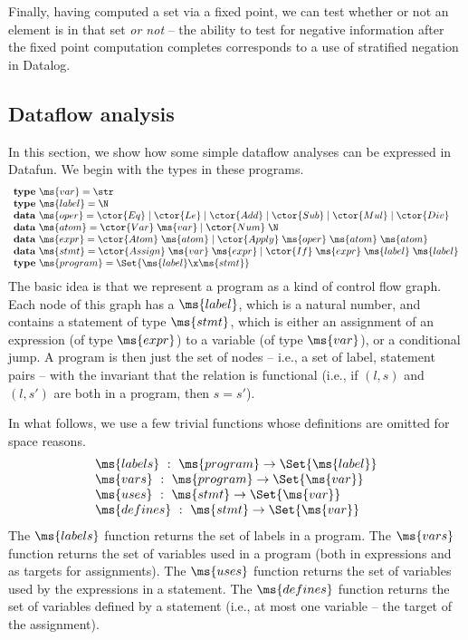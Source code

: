 Finally, having computed a set via a fixed point, we can test whether
or not an element is in that set \emph{or not} -- the ability to test
for negative information after the fixed point computation completes
corresponds to a use of stratified negation in Datalog.


\subsection{Dataflow analysis}
In this section, we show how some simple dataflow analyses can be expressed in
Datafun. We begin with the types in these programs.
\[\begin{array}{l}
\textbf{type}~\ms{var} = \str\\
\textbf{type}~\ms{label} = \N\\
\textbf{data}~\ms{oper} = \ctor{Eq} \pipe \ctor{Le}
\pipe \ctor{Add} \pipe \ctor{Sub} \pipe\ctor{Mul}\pipe\ctor{Div}\\
\textbf{data}~\ms{atom} = \ctor{Var}\;\ms{var} \pipe \ctor{Num}\;\N\\
\textbf{data}~\ms{expr} = \ctor{Atom}\;\ms{atom}
\pipe \ctor{Apply}\;\ms{oper}\;\ms{atom}\;\ms{atom}\\
\textbf{data}~\ms{stmt} =
\ctor{Assign} \;\ms{var} \;\ms{expr}
\pipe \ctor{If} \;\ms{expr} \;\ms{label}\;\ms{label} \\
\textbf{type}~\ms{program} = \Set{\ms{label} \x \ms{stmt}}

\end{array}\]
The basic idea is that we represent a program as a kind of control
flow graph. Each node of this graph has a $\ms{label}$, which is a
natural number, and contains a statement of type $\ms{stmt}$, which is
either an assignment of an expression (of type $\ms{expr}$) to a
variable (of type $\ms{var}$), or a conditional jump.  A program is
then just the set of nodes -- i.e., a set of label, statement pairs --
with the invariant that the relation is functional (i.e., if $(l, s)$
and $(l,s')$ are both in a program, then $s = s'$).

In what follows, we use a few trivial functions whose definitions are omitted
for space reasons.
\[\begin{array}{l}
\ms{labels} ~:~ \ms{program} \uto \Set{\ms{label}}\\
\ms{vars} ~:~ \ms{program} \uto \Set{\ms{var}}\\
\ms{uses} ~:~ \ms{stmt} \uto \Set{\ms{var}}\\
\ms{defines} ~:~ \ms{stmt} \uto \Set{\ms{var}}
\end{array}\]
The $\ms{labels}$ function returns the set of labels in a program. The
$\ms{vars}$ function returns the set of variables used in a program (both in
expressions and as targets for assignments). The $\ms{uses}$ function
returns the set of variables used by the expressions in a statement. The
$\ms{defines}$ function returns the set of variables defined by a statement
(i.e., at most one variable -- the target of the assignment).

